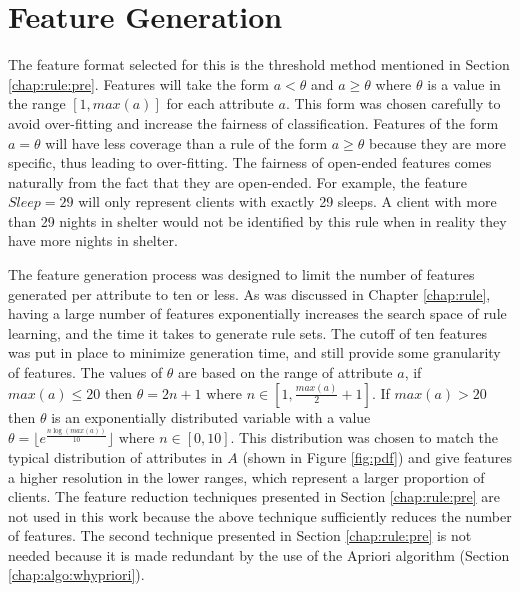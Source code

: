 \section{Feature Generation} \label{chap:algo:binning}

The feature format selected for this is the threshold method mentioned in Section \ref{chap:rule:pre}. Features will take the form $a < \theta$ and $a \geq \theta$ where $\theta$ is a value in the range $[1, max(a)]$ for each attribute $a$. This form was chosen carefully to avoid over-fitting and increase the fairness of classification. Features of the form $a = \theta$ will have less coverage than a rule of the form $a \geq \theta$ because they are more specific, thus leading to over-fitting. The fairness of open-ended features comes naturally from the fact that they are open-ended. For example, the feature $Sleep = 29$ will only represent clients with exactly 29 sleeps. A client with more than 29 nights in shelter would not be identified by this rule when in reality they have more nights in shelter.


The feature generation process was designed to limit the number of features generated per attribute to ten or less. As was discussed in Chapter \ref{chap:rule}, having a large number of features exponentially increases the search space of rule learning, and the time it takes to generate rule sets. The cutoff of ten features was put in place to minimize generation time, and still provide some granularity of features.
The values of $\theta$ are based on the range of attribute $a$, if $max(a) \leq 20$ then $\theta = 2n + 1 \text{ where } n \in [1, \frac{max(a)}{2} + 1]$. If $max(a) > 20$ then $\theta$ is an exponentially distributed variable with a value $\theta = \lfloor e^\frac{n\log(max(a))}{10} \rfloor \text{ where } n \in  [0, 10]$. This distribution was chosen to match the typical distribution of attributes in $A$ (shown in Figure \ref{fig:pdf}) and give features a higher resolution in the lower ranges, which represent a larger proportion of clients.
The feature reduction techniques presented in Section \ref{chap:rule:pre} are not used in this work because the above technique sufficiently reduces the number of features. The second technique presented in Section \ref{chap:rule:pre} is not needed because it is made redundant by the use of the Apriori algorithm (Section \ref{chap:algo:whypriori}).




